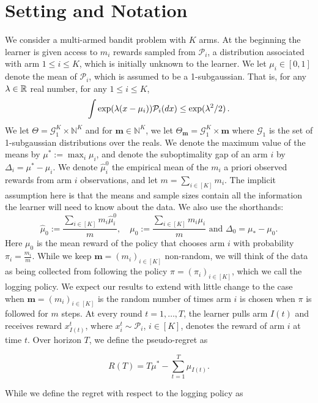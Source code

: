 \section{Setting and Notation}

We consider a multi-armed bandit problem with $K$ arms. At the beginning the learner is given access to $m_i$ rewards sampled from $\mathcal{P}_i$, a distribution associated with arm $1\leq i \leq K$, which is initially unknown to the learner. We let $\mu_i \in [0,1]$ denote the mean of $\mathcal{P}_i$, which is assumed to be a 1-subgaussian. That is, for any $\lambda\in \mathbb{R}$ real number, for any $1\leq i \leq K$,
\begin{align*}
\int \exp(\lambda (x-\mu_i)) \mathcal{P}_i(dx) \le \exp( \lambda^2/2) \,.
\end{align*}
We let $\Theta= \mathcal{G}_1^K \times \mathbb{N}^K$ and for $\textbf{m}\in \mathbb{N}^K$, we let $\Theta_{\mathbf{m}}= \mathcal{G}_1^K \times \textbf{m}$ where $\mathcal{G}_1$ is the set of 1-subgaussian distributions over the reals.
 We denote the maximum value of the means by $\mu^*:= \max_i \mu_i$, and denote the suboptimality gap of an arm $i$ by $\Delta_i=\mu^*-\mu_i$.  We denote $\hat{\mu}_i^0$ the empirical mean of the $m_i$ a priori observed rewards from arm $i$ observations, and let $m=\sum_{i \in [K]}m_i$. The implicit assumption here is that the means and sample sizes contain all the information the learner will need to know about the data. We also use the shorthands:
\[
\hat{\mu}_0:= \frac{\sum_{i \in [K]}m_i\hat{\mu}_i^0}{m},\quad  \mu_0:= \frac{\sum_{i \in [K]}m_i\mu_i}{m} \text{ and }\Delta_0= \mu_*-\mu_0.
\]
Here $\mu_0$ is the mean reward of the policy that chooses arm $i$ with probability $\pi_i= \frac{m_i}{m}$. While we keep $\mathbf{m}= \left(m_i\right)_{i \in [K]}$ non-random, we will think of the data as being collected from following the policy $\pi= \left(\pi_i\right)_{i \in [K]}$, which we call the logging policy. We expect our results to extend with little change to the case when $\mathbf{m}= \left(m_i\right)_{i \in [K]}$ is the random number of times arm $i$ is chosen when $\pi$ is followed for $m$ steps.
At every round  $t=1,\ldots,T$, the learner pulls arm $I(t)$ and receives reward $x^t_{I(t)}$, where $x_i^t\sim \mathcal{P}_i$, $i\in [K]$, denotes the reward of arm $i$ at time $t$.  Over horizon $T$, we define the pseudo-regret as

\[
R(T)= 
 T\mu^* - \sum_{t=1}^T\mu_{I(t)}.
\]

While we define the regret with respect to the logging policy as

